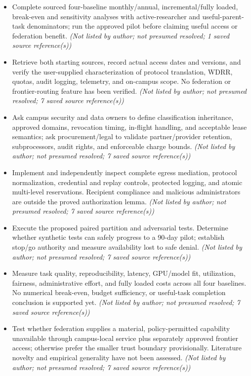 \documentclass[11pt]{article}
\begin{document}
\begin{itemize}
\item Complete sourced four-baseline monthly/annual, incremental/fully loaded, break-even and sensitivity analyses with active-researcher and useful-parent-task denominators; run the approved pilot before claiming useful access or federation benefit. \textit{ (Not listed by author; not presumed resolved; 1 saved source reference(s))}
\item Retrieve both starting sources, record actual access dates and versions, and verify the user-supplied characterization of protocol translation, WDRR, quotas, audit logging, telemetry, and on-campus scope. No federation or frontier-routing feature has been verified. \textit{ (Not listed by author; not presumed resolved; 7 saved source reference(s))}
\item Ask campus security and data owners to define classification inheritance, approved domains, revocation timing, in-flight handling, and acceptable lease semantics; ask procurement/legal to validate partner/provider retention, subprocessors, audit rights, and enforceable charge bounds. \textit{ (Not listed by author; not presumed resolved; 7 saved source reference(s))}
\item Implement and independently inspect complete egress mediation, protocol normalization, credential and replay controls, protected logging, and atomic multi-level reservations. Recipient compliance and malicious administrators are outside the proved authorization lemma. \textit{ (Not listed by author; not presumed resolved; 7 saved source reference(s))}
\item Execute the proposed paired partition and adversarial tests. Determine whether synthetic tests can safely progress to a 90-day pilot; establish stop/go authority and measure availability lost to safe denial. \textit{ (Not listed by author; not presumed resolved; 7 saved source reference(s))}
\item Measure task quality, reproducibility, latency, GPU/model fit, utilization, fairness, administrative effort, and fully loaded costs across all four baselines. No numerical break-even, budget sufficiency, or useful-task completion conclusion is supported yet. \textit{ (Not listed by author; not presumed resolved; 7 saved source reference(s))}
\item Test whether federation supplies a material, policy-permitted capability unavailable through campus-local service plus separately approved frontier access; otherwise prefer the smaller trust boundary provisionally. Literature novelty and empirical generality have not been assessed. \textit{ (Not listed by author; not presumed resolved; 7 saved source reference(s))}

\end{itemize}
\end{document}
